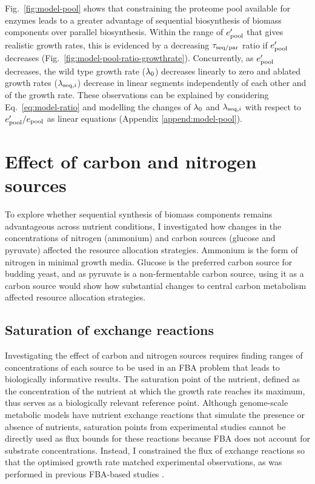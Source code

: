 Fig.\ \ref{fig:model-pool} shows that constraining the proteome pool available for enzymes leads to a greater advantage of sequential biosynthesis of biomass components over parallel biosynthesis.
Within the range of $e_{\mathrm{pool}}^{\prime}$ that gives realistic growth rates, this is evidenced by a decreasing $\tau_{\mathrm{seq}/\mathrm{par}}$ ratio if $e_{\mathrm{pool}}^{\prime}$ decreases (Fig.\ \ref{fig:model-pool-ratio-growthrate}).
Concurrently, as $e_{\mathrm{pool}}^{\prime}$ decreases, the wild type growth rate ($\lambda_{0}$) decreases linearly to zero and ablated growth rates ($\lambda_{\mathrm{seq},i}$) decrease in linear segments independently of each other and of the growth rate.
These observations can be explained by considering Eq.\ \ref{eq:model-ratio} and modelling the changes of $\lambda_{0}$ and $\lambda_{\mathrm{seq},i}$ with respect to $e_{\mathrm{pool}}^{\prime}/e_{\mathrm{pool}}$ as linear equations (Appendix \ref{append:model-pool}).


\section{Effect of carbon and nitrogen sources}
\label{sec:model-exchange}

To explore whether sequential synthesis of biomass components remains advantageous across nutrient conditions, I investigated how changes in the concentrations of nitrogen (ammonium) and carbon sources (glucose and pyruvate) affected the resource allocation strategies.
Ammonium is the form of nitrogen in minimal growth media.
Glucose is the preferred carbon source for budding yeast, and as pyruvate is a non-fermentable carbon source, using it as a carbon source would show how substantial changes to central carbon metabolism affected resource allocation strategies.

\subsection{Saturation of exchange reactions}
\label{subsec:model-saturation}

Investigating the effect of carbon and nitrogen sources requires finding ranges of concentrations of each source to be used in an FBA problem that leads to biologically informative results.
The saturation point of the nutrient, defined as the concentration of the nutrient at which the growth rate reaches its maximum, thus serves as a biologically relevant reference point.
Although genome-scale metabolic models have nutrient exchange reactions that simulate the presence or absence of nutrients, saturation points from experimental studies cannot be directly used as flux bounds for these reactions because FBA does not account for substrate concentrations.
Instead, I constrained the flux of exchange reactions so that the optimised growth rate matched experimental observations, as was performed in previous FBA-based studies \parencite{elsemmanWholecellModelingYeast2022,familiSaccharomycesCerevisiaePhenotypes2003}.



